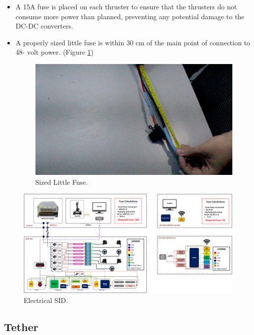 \documentclass[11pt, twocolumn]{article}
\begin{document}
\begin{itemize}[leftmargin=0pt, itemindent=10pt]
    \setlength{\itemsep}{0pt}

    \item A 15A fuse is placed on each thruster to ensure that the thrusters do not consume more power than planned, preventing any potential damage to the DC-DC converters.
    \item A properly sized little fuse is within 30 cm of the main point of connection to 48- volt power. (Figure \ref{fig:fuse})
    
    \begin{figure}[h!]
        \centering
        \includegraphics[width=0.8\columnwidth]{Images/fuse.png}
        \caption{Sized Little Fuse.}
        \label{fig:fuse}
    \end{figure}
\end{itemize}

\begin{figure}[hb!]
    \centering
    \includegraphics[width=\textwidth]{Images/electrical SID.png}
    \caption{Electrical SID.}
    \label{fig:electrical_sid}
\end{figure}

\subsection{Tether}
\end{document}
